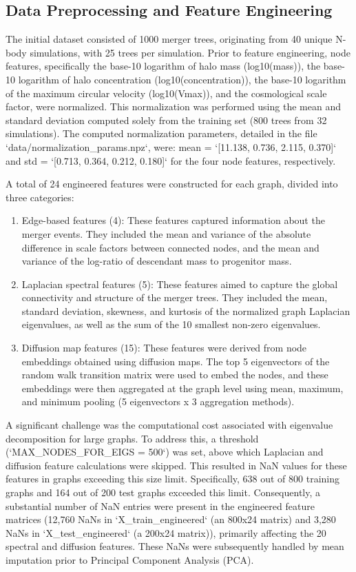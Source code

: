 \documentclass[twocolumn]{aastex631}
\begin{document}
\subsection{Data Preprocessing and Feature Engineering}

The initial dataset consisted of 1000 merger trees, originating from 40 unique N-body simulations, with 25 trees per simulation. Prior to feature engineering, node features, specifically the base-10 logarithm of halo mass (log10(mass)), the base-10 logarithm of halo concentration (log10(concentration)), the base-10 logarithm of the maximum circular velocity (log10(Vmax)), and the cosmological scale factor, were normalized. This normalization was performed using the mean and standard deviation computed solely from the training set (800 trees from 32 simulations). The computed normalization parameters, detailed in the file `data/normalization_params.npz`, were: mean = `[11.138, 0.736, 2.115, 0.370]` and std = `[0.713, 0.364, 0.212, 0.180]` for the four node features, respectively.

A total of 24 engineered features were constructed for each graph, divided into three categories:
\begin{enumerate}
    \item Edge-based features (4): These features captured information about the merger events. They included the mean and variance of the absolute difference in scale factors between connected nodes, and the mean and variance of the log-ratio of descendant mass to progenitor mass.
    \item Laplacian spectral features (5): These features aimed to capture the global connectivity and structure of the merger trees. They included the mean, standard deviation, skewness, and kurtosis of the normalized graph Laplacian eigenvalues, as well as the sum of the 10 smallest non-zero eigenvalues.
    \item Diffusion map features (15): These features were derived from node embeddings obtained using diffusion maps. The top 5 eigenvectors of the random walk transition matrix were used to embed the nodes, and these embeddings were then aggregated at the graph level using mean, maximum, and minimum pooling (5 eigenvectors x 3 aggregation methods).
\end{enumerate}

A significant challenge was the computational cost associated with eigenvalue decomposition for large graphs. To address this, a threshold (`MAX_NODES_FOR_EIGS = 500`) was set, above which Laplacian and diffusion feature calculations were skipped. This resulted in NaN values for these features in graphs exceeding this size limit. Specifically, 638 out of 800 training graphs and 164 out of 200 test graphs exceeded this limit. Consequently, a substantial number of NaN entries were present in the engineered feature matrices (12,760 NaNs in `X_train_engineered` (an 800x24 matrix) and 3,280 NaNs in `X_test_engineered` (a 200x24 matrix)), primarily affecting the 20 spectral and diffusion features. These NaNs were subsequently handled by mean imputation prior to Principal Component Analysis (PCA).
\end{document}
